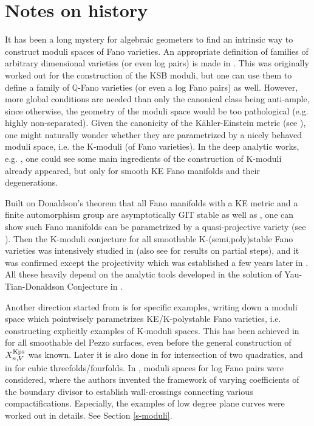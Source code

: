 \documentclass[12pt,reqno]{amsart}%
\theoremstyle{definition}
\theoremstyle{remark}
\newcommand{\bQ}{{\mathbb{Q}}}
\begin{document}
\section*{Notes on history}

It has been a long mystery for algebraic geometers to find an intrinsic way to construct moduli spaces of Fano varieties. An appropriate definition of families of arbitrary dimensional varieties (or even log pairs)  is made in \cite{Kol21,Kol19}. This was originally worked out for the construction of the KSB moduli, but one can use them to define a family of $\bQ$-Fano varieties (or even a log Fano pairs) as well. However,  more global conditions are needed than only the canonical class being anti-ample, since otherwise, the geometry of the moduli space would be too pathological (e.g. highly non-separated).
Given the canonicity of the K\"ahler-Einstein metric (see \cite{BM87}), one might naturally wonder whether they are parametrized by a nicely behaved moduli space, i.e. the K-moduli (of Fano varieties). In the deep analytic works, e.g. \cite{Tia90,Tia97, Don01, DS14, CDS, Tia15}, one could see some main ingredients of the construction of K-moduli already appeared, but only for smooth KE Fano manifolds and their degenerations.

Built on Donaldson's theorem that all Fano manifolds with a KE metric and a finite automorphism group are asymptotically GIT stable \cite{Don01} as well as \cite{DS14}, one can show such Fano manifolds can be parametrized by a quasi-projective variety  (see \cite{Oda12b, Don15}). Then the K-moduli conjecture for all smoothable K-(semi,poly)stable Fano varieties was intensively studied in \cite{LWX19} (also see \cite{SSY16,Oda15} for results on partial steps), and it was confirmed  except the projectivity which was established a few years later in \cite{XZ19}. All these heavily depend on the analytic tools developed in the solution of Yau-Tian-Donaldson Conjecture in \cite{CDS, Tia15}. 

Another direction started from \cite{Tia92,MM93} is for specific examples, writing down a moduli space which pointwisely parametrizes KE/K-polystable Fano varieties, i.e. constructing explicitly examples of K-moduli spaces. This has been achieved in \cite{MM93, OSS16} for all smoothable del Pezzo surfaces, even before the general construction of $X^{\rm Kps}_{n,V}$ was known. Later it is also done in \cite{SS17} for intersection of two quadratics, and in \cite{LX19, Liu20} for cubic threefolds/fourfolds. In \cite{ADL19, ADL20}, moduli spaces for log Fano pairs were considered, where the authors invented the framework of varying coefficients of the boundary divisor to establish wall-crossings connecting various compactifications. Especially, the examples of low degree plane curves were worked out in details. See Section \ref{s-moduli}.
\end{document}
